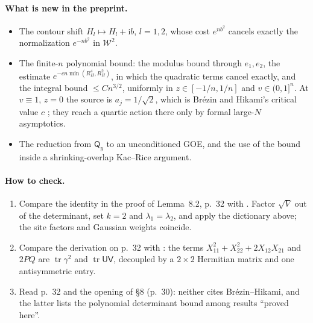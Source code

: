 \documentclass[11pt]{article}
\newcommand{\ploc}[2]{#1}
\newcommand{\sloc}[2]{\cite[#2]{#1}}
\begin{document}
\paragraph{What is new in the preprint.}
\begin{itemize}
\item The contour shift $H_l\mapsto H_l+\mathrm ib$, $l=1,2$, whose cost
$e^{nb^2}$ cancels exactly the normalization $e^{-nb^2}$ in $\mathcal W^2$.
\item The finite-$n$ polynomial bound: the modulus bound through $e_1,e_2$, the
estimate $e^{-cn\min(R_H^4,R_H^2)}$, in which the quadratic terms cancel
exactly, and the integral bound $\le Cn^{3/2}$, uniformly in $z\in[-1/n,1/n]$
and $v\in(0,1]^n$. At $v\equiv1$, $z=0$ the source is $a_j=1/\sqrt2$, which is
Br\'ezin and Hikami's critical value $c$
\sloc{BrezinHikami2001-CharPolyRealSymmetric}{(91), p.~20}; they reach a
quartic action there only by formal large-$N$ asymptotics.
\item The reduction from $\mathsf Q_y$ to an unconditioned GOE, and the use of
the bound inside a shrinking-overlap Kac--Rice argument.
\end{itemize}

\paragraph{How to check.}
\begin{enumerate}
\item Compare \ploc{the identity in the proof of Lemma~8.2, p.~32}{profile-roots.tex:152--162}
with \sloc{BrezinHikami2001-CharPolyRealSymmetric}{eqs.~(88)--(89), pp.~19--20,
and (43), p.~10}. Factor $\sqrt V$ out of the determinant, set $k=2$ and
$\lambda_1=\lambda_2$, and apply the dictionary above; the site factors and
Gaussian weights coincide.
\item Compare \ploc{the derivation on p.~32}{profile-roots.tex:162--170} with
\sloc{BrezinHikami2001-CharPolyRealSymmetric}{eqs.~(6)--(7), p.~3, and
(22)--(30), pp.~6--7}: the terms $X_{11}^2+X_{22}^2+2X_{12}X_{21}$ and $2PQ$ are
$\operatorname{tr}\gamma^2$ and $\operatorname{tr}\mathsf U\mathsf V$, decoupled
by a $2\times2$ Hermitian matrix and one antisymmetric entry.
\item Read \ploc{p.~32}{profile-roots.tex:152--170} and the opening of
\ploc{\S8 (p.~30)}{profile-roots.tex:10--15}: neither cites Br\'ezin--Hikami,
and the latter lists the polynomial determinant bound among results ``proved
here''.
\end{enumerate}
\end{document}
